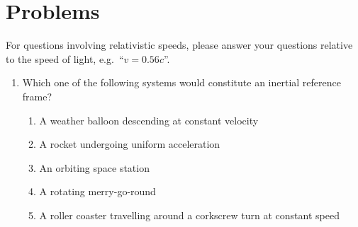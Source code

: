 \newpage
\section*{Problems}
For questions involving relativistic speeds, please answer your questions
relative to the speed of light, e.g.\ ``$v=0.56c$''.

\begin{enumerate}[itemsep=6pt]
\item Which one of the following systems would constitute an inertial
  reference frame?
  \begin{enumerate}
  \item A weather balloon descending at constant velocity
  \item A rocket undergoing uniform acceleration
  \item An orbiting space station
  \item A rotating merry-go-round
  \item A roller coaster travelling around a corkscrew turn at constant speed
  \end{enumerate}
  


\end{enumerate}
